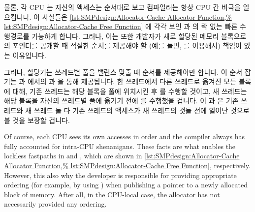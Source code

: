 물론, 각 CPU 는 자신의 액세스는 순서대로 보고 컴파일러는 항상 CPU 간 비극을
일으킵니다.
이 사실들은
\cref{lst:SMPdesign:Allocator-Cache Allocator Function,%
lst:SMPdesign:Allocator-Cache Free Function} 에 각각 보인 
과  의 락 없는 빠른 수행경로를 가능하게 합니다.
그러나, 이는 또한 개발자가 새로 할당된 메모리 블록으로의 포인터를 공개할 때
적절한 순서를 제공해야 할 (예를 들면,  를 이용해서)
책임이 있는 이유입니다.

그러나, 할당기는 쓰레드별 풀을 밸런스 맞출 때 순서를 제공해야만 합니다.
이 순서 잡기는  과  에서의
 과  을 통해 제공됩니다.
한 쓰레드에서 다른 쓰레드로 옮겨진 모든 블록에 대해, 기존 쓰레드는 해당 블록을
 풀에 위치시킨 후  를 수행할
것이고, 새 쓰레드는 해당 블록을 자신의 쓰레드별 풀에 옮기기 전에
 를 수행했을 겁니다.
이  과  은 기존 쓰레드와 새 쓰레드 둘 다 기존
쓰레드의 액세스가 새 쓰레드의 것들 전에 일어난 것으로 볼 것을 보장할 겁니다.

\iffalse

Of course, each CPU sees its own accesses in order and the compiler
always has fully accounted for intra-CPU shenanigans.
These facts are what enables the lockless fastpaths in
 and , which are shown in
\cref{lst:SMPdesign:Allocator-Cache Allocator Function,%
lst:SMPdesign:Allocator-Cache Free Function},
respectively.
However, this also why the developer is responsible for providing
appropriate ordering (for example, by using )
when publishing a pointer to a newly allocated block of memory.
After all, in the CPU-local case, the allocator has not necessarily
provided any ordering.

